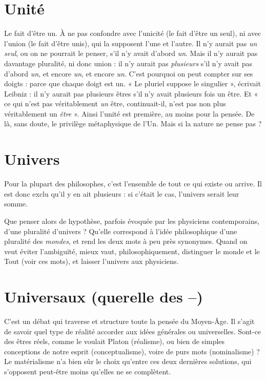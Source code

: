 \section{Unité}
Le fait d’être un. À ne pas confondre avec l’unicité (le fait d’être un
seul), ni avec l’union (le fait d’être unis), qui la supposent l’une et
l’autre. Il n’y aurait pas {\it un seul}, ou on ne pourrait le penser, s’il n’y avait
d’abord {\it un}. Mais il n’y aurait pas davantage pluralité, ni donc union : il n’y
aurait pas {\it plusieurs} s’il n’y avait pas d’abord {\it un}, et encore {\it un}, et encore {\it un}.
C’est pourquoi on peut compter sur ses doigts : parce que chaque doigt est un.
« Le pluriel suppose le singulier », écrivait Leibniz : il n’y aurait pas plusieurs
êtres s’il n’y avait plusieurs fois un être. Et « ce qui n’est pas véritablement {\it un}
être, continuait-il, n’est pas non plus véritablement un {\it être} ». Ainsi l’unité est
première, au moins pour la pensée. De là, sans doute, le privilège métaphysique
de l’Un. Mais si la nature ne pense pas ?

\section{Univers}
Pour la plupart des philosophes, c’est l’ensemble de tout ce qui
existe ou arrive. Il est donc exclu qu’il y en ait plusieurs : si c’était
le cas, l’univers serait leur somme.

Que penser alors de hypothèse, parfois évoquée par les physiciens contemporains,
d’une pluralité d’univers ? Qu’elle correspond à l’idée philosophique
d’une pluralité des {\it mondes}, et rend les deux mots à peu près synonymes. Quand
on veut éviter l'ambiguïté, mieux vaut, philosophiquement, distinguer le
monde et le Tout (voir ces mots), et laisser l’univers aux physiciens.

\section{Universaux (querelle des {\bf --})}
C’est un débat qui traverse et structure
toute la pensée du Moyen-Âge. Il
s’agit de savoir quel type de réalité accorder aux idées générales ou universelles.
Sont-ce des êtres réels, comme le voulait Platon (réalisme), ou bien de simples
conceptions de notre esprit (conceptualisme), voire de purs mots (nominalisme) ?
Le matérialisme n’a bien sûr le choix qu’entre ces deux dernières solutions,
qui s'opposent peut-être moins qu’elles ne se complètent.

